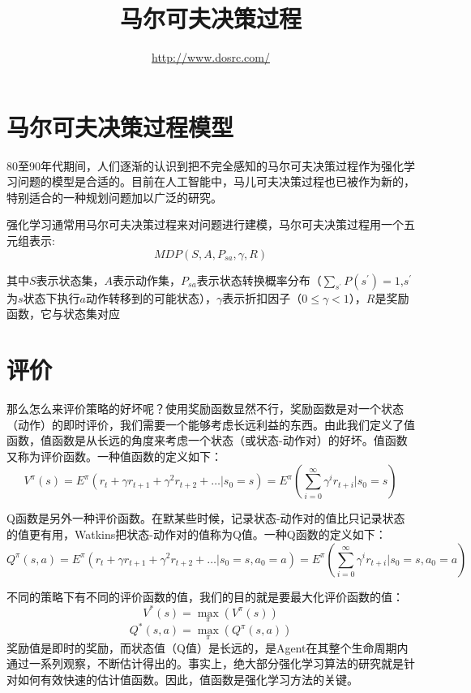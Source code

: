 \documentclass{article} %
\title{马尔可夫决策过程}
\author{
 \url{http://www.dosrc.com/}
}
\begin{document}
\begin{CJK*}{UTF8}{gkai}

\maketitle

\section{马尔可夫决策过程模型}
80至90年代期间，人们逐渐的认识到把不完全感知的马尔可夫决策过程作为强化学习问题的模型是合适的。目前在人工智能中，马儿可夫决策过程也已被作为新的，特别适合的一种规划问题加以广泛的研究。

强化学习通常用马尔可夫决策过程来对问题进行建模，马尔可夫决策过程用一个五元组表示:$$MDP \left (S,A,{P _{sa}},\gamma,R\right )$$

其中$S$表示状态集，$A$表示动作集，$P _{sa}$表示状态转换概率分布（$\sum _{s ^{'}}P\left (s ^{'}\right )=1$,$s ^{'}$为$s$状态下执行$a$动作转移到的可能状态），$\gamma$表示折扣因子（$0 \leq \gamma < 1$），$R$是奖励函数，它与状态集对应

\section{评价}
那么怎么来评价策略的好坏呢？使用奖励函数显然不行，奖励函数是对一个状态（动作）的即时评价，我们需要一个能够考虑长远利益的东西。由此我们定义了值函数，值函数是从长远的角度来考虑一个状态（或状态-动作对）的好坏。值函数又称为评价函数。一种值函数的定义如下：
$$V ^{\pi}\left (s\right ) = E ^{\pi}\left (r _{t}+\gamma r _{t+1}+\gamma ^{2}r _{t+2}+\dots \vert s _{0}=s\right ) =E ^{\pi}\left (\sum _{i=0} ^{\infty}\gamma ^{i} r _{t+i}\vert s _{0}=s\right )$$

Q函数是另外一种评价函数。在默某些时候，记录状态-动作对的值比只记录状态的值更有用，Watkins把状态-动作对的值称为Q值。一种Q函数的定义如下：
$$Q ^{\pi}\left (s,a\right ) = E ^{\pi}\left (r _{t}+\gamma r _{t+1}+\gamma ^{2}r _{t+2}+\dots \vert s _{0}=s,a _{0}=a\right ) =E ^{\pi}\left (\sum _{i=0} ^{\infty}\gamma ^{i} r _{t+i}\vert s _{0}=s,a _{0}=a\right )$$

不同的策略下有不同的评价函数的值，我们的目的就是要最大化评价函数的值：
$$V ^{*}\left (s\right )=\max _{\pi}\left ( V ^{\pi}\left (s\right ) \right )$$
$$Q ^{*}\left (s,a\right )=\max _{\pi}\left ( Q ^{\pi}\left (s,a\right ) \right )$$
奖励值是即时的奖励，而状态值（Q值）是长远的，是Agent在其整个生命周期内通过一系列观察，不断估计得出的。事实上，绝大部分强化学习算法的研究就是针对如何有效快速的估计值函数。因此，值函数是强化学习方法的关键。


\end{CJK*}
\end{document}
